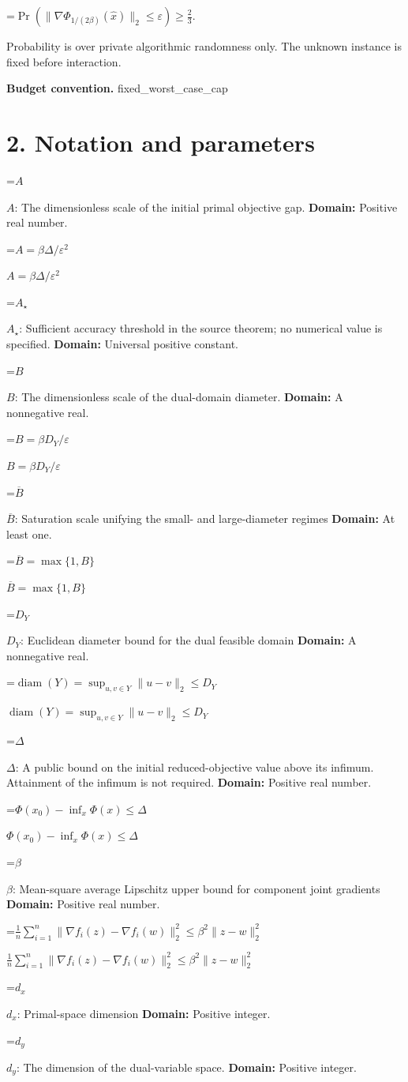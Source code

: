 \documentclass[10pt,a4paper]{article}
\newcommand{\AtlasMath}[1]{\par\begingroup\centering\setbox0=\hbox{$\displaystyle #1$}\ifdim\wd0>1.4\linewidth\typeout{ATLAS WIDE FORMULA: \the\wd0}\fi\ifdim\wd0>\linewidth\resizebox{\linewidth}{!}{\box0}\else\box0\fi\par\endgroup}
\newcommand{\AtlasInlineMath}[1]{\begingroup\setbox0=\hbox{$#1$}\ifdim\wd0>.4\linewidth\endgroup\AtlasMath{#1}\else\endgroup$#1$\fi}
\begin{document}
\AtlasMath{\Pr\!\left(\|\nabla\Phi_{1/(2\beta)}(\widehat{x})\|_2\le\varepsilon\right)\ge\frac23.}


Probability is over private algorithmic randomness only. The unknown instance is fixed before interaction.

\textbf{Budget convention.} fixed\_worst\_case\_cap

\section{2. Notation and parameters}
\AtlasInlineMath{A}: The dimensionless scale of the initial primal objective gap. \textbf{Domain:} Positive real number.

\AtlasInlineMath{A=\beta\Delta/\varepsilon^2}

\AtlasInlineMath{A_\star}: Sufficient accuracy threshold in the source theorem; no numerical value is specified. \textbf{Domain:} Universal positive constant.

\AtlasInlineMath{B}: The dimensionless scale of the dual-domain diameter. \textbf{Domain:} A nonnegative real.

\AtlasInlineMath{B=\beta D_Y/\varepsilon}

\AtlasInlineMath{\overline B}: Saturation scale unifying the small- and large-diameter regimes \textbf{Domain:} At least one.

\AtlasInlineMath{\overline B=\max\{1,B\}}

\AtlasInlineMath{D_Y}: Euclidean diameter bound for the dual feasible domain \textbf{Domain:} A nonnegative real.

\AtlasInlineMath{\operatorname{diam}(Y)=\sup_{u,v\in Y}\|u-v\|_2\le D_Y}

\AtlasInlineMath{\Delta}: A public bound on the initial reduced-objective value above its infimum. Attainment of the infimum is not required. \textbf{Domain:} Positive real number.

\AtlasInlineMath{\Phi(x_0)-\inf_x\Phi(x)\le\Delta}

\AtlasInlineMath{\beta}: Mean-square average Lipschitz upper bound for component joint gradients \textbf{Domain:} Positive real number.

\AtlasInlineMath{\frac1n\sum_{i=1}^n\|\nabla f_i(z)-\nabla f_i(w)\|_2^2\le\beta^2\|z-w\|_2^2}

\AtlasInlineMath{d_x}: Primal-space dimension \textbf{Domain:} Positive integer.

\AtlasInlineMath{d_y}: The dimension of the dual-variable space. \textbf{Domain:} Positive integer.
\end{document}
